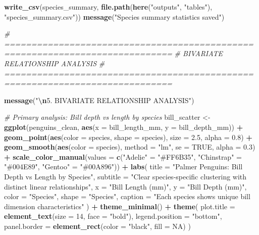 \documentclass[
]{article}
\newenvironment{Shaded}{\begin{snugshade}}{\end{snugshade}}
\newcommand{\AttributeTok}[1]{\textcolor[rgb]{0.13,0.29,0.53}{#1}}
\newcommand{\CommentTok}[1]{\textcolor[rgb]{0.56,0.35,0.01}{\textit{#1}}}
\newcommand{\ConstantTok}[1]{\textcolor[rgb]{0.56,0.35,0.01}{#1}}
\newcommand{\DecValTok}[1]{\textcolor[rgb]{0.00,0.00,0.81}{#1}}
\newcommand{\FloatTok}[1]{\textcolor[rgb]{0.00,0.00,0.81}{#1}}
\newcommand{\FunctionTok}[1]{\textcolor[rgb]{0.13,0.29,0.53}{\textbf{#1}}}
\newcommand{\NormalTok}[1]{#1}
\newcommand{\OtherTok}[1]{\textcolor[rgb]{0.56,0.35,0.01}{#1}}
\newcommand{\SpecialCharTok}[1]{\textcolor[rgb]{0.81,0.36,0.00}{\textbf{#1}}}
\newcommand{\StringTok}[1]{\textcolor[rgb]{0.31,0.60,0.02}{#1}}
\begin{document}
\begin{Shaded}
\begin{Highlighting}[]
\FunctionTok{write\_csv}\NormalTok{(species\_summary, }\FunctionTok{file.path}\NormalTok{(}\FunctionTok{here}\NormalTok{(}\StringTok{"outputs"}\NormalTok{, }\StringTok{"tables"}\NormalTok{), }\StringTok{"species\_summary.csv"}\NormalTok{))}
\FunctionTok{message}\NormalTok{(}\StringTok{"Species summary statistics saved"}\NormalTok{)}

\CommentTok{\# =============================================================================}
\CommentTok{\# BIVARIATE RELATIONSHIP ANALYSIS}
\CommentTok{\# =============================================================================}

\FunctionTok{message}\NormalTok{(}\StringTok{"}\SpecialCharTok{\textbackslash{}n}\StringTok{5. BIVARIATE RELATIONSHIP ANALYSIS"}\NormalTok{)}

\CommentTok{\# Primary analysis: Bill depth vs length by species}
\NormalTok{bill\_scatter }\OtherTok{\textless{}{-}} \FunctionTok{ggplot}\NormalTok{(penguins\_clean, }\FunctionTok{aes}\NormalTok{(}\AttributeTok{x =}\NormalTok{ bill\_length\_mm, }\AttributeTok{y =}\NormalTok{ bill\_depth\_mm)) }\SpecialCharTok{+}
  \FunctionTok{geom\_point}\NormalTok{(}\FunctionTok{aes}\NormalTok{(}\AttributeTok{color =}\NormalTok{ species, }\AttributeTok{shape =}\NormalTok{ species), }\AttributeTok{size =} \FloatTok{2.5}\NormalTok{, }\AttributeTok{alpha =} \FloatTok{0.8}\NormalTok{) }\SpecialCharTok{+}
  \FunctionTok{geom\_smooth}\NormalTok{(}\FunctionTok{aes}\NormalTok{(}\AttributeTok{color =}\NormalTok{ species), }\AttributeTok{method =} \StringTok{"lm"}\NormalTok{, }\AttributeTok{se =} \ConstantTok{TRUE}\NormalTok{, }\AttributeTok{alpha =} \FloatTok{0.3}\NormalTok{) }\SpecialCharTok{+}
  \FunctionTok{scale\_color\_manual}\NormalTok{(}\AttributeTok{values =} \FunctionTok{c}\NormalTok{(}\StringTok{"Adelie"} \OtherTok{=} \StringTok{"\#FF6B35"}\NormalTok{, }\StringTok{"Chinstrap"} \OtherTok{=} \StringTok{"\#004E89"}\NormalTok{, }\StringTok{"Gentoo"} \OtherTok{=} \StringTok{"\#00A896"}\NormalTok{)) }\SpecialCharTok{+}
  \FunctionTok{labs}\NormalTok{(}
    \AttributeTok{title =} \StringTok{"Palmer Penguins: Bill Depth vs Length by Species"}\NormalTok{,}
    \AttributeTok{subtitle =} \StringTok{"Clear species{-}specific clustering with distinct linear relationships"}\NormalTok{,}
    \AttributeTok{x =} \StringTok{"Bill Length (mm)"}\NormalTok{,}
    \AttributeTok{y =} \StringTok{"Bill Depth (mm)"}\NormalTok{,}
    \AttributeTok{color =} \StringTok{"Species"}\NormalTok{,}
    \AttributeTok{shape =} \StringTok{"Species"}\NormalTok{,}
    \AttributeTok{caption =} \StringTok{"Each species shows unique bill dimension characteristics"}
\NormalTok{  ) }\SpecialCharTok{+}
  \FunctionTok{theme\_minimal}\NormalTok{() }\SpecialCharTok{+}
  \FunctionTok{theme}\NormalTok{(}
    \AttributeTok{plot.title =} \FunctionTok{element\_text}\NormalTok{(}\AttributeTok{size =} \DecValTok{14}\NormalTok{, }\AttributeTok{face =} \StringTok{"bold"}\NormalTok{),}
    \AttributeTok{legend.position =} \StringTok{"bottom"}\NormalTok{,}
    \AttributeTok{panel.border =} \FunctionTok{element\_rect}\NormalTok{(}\AttributeTok{color =} \StringTok{"black"}\NormalTok{, }\AttributeTok{fill =} \ConstantTok{NA}\NormalTok{)}
\NormalTok{  )}


\end{Highlighting}
\end{Shaded}
\end{document}
